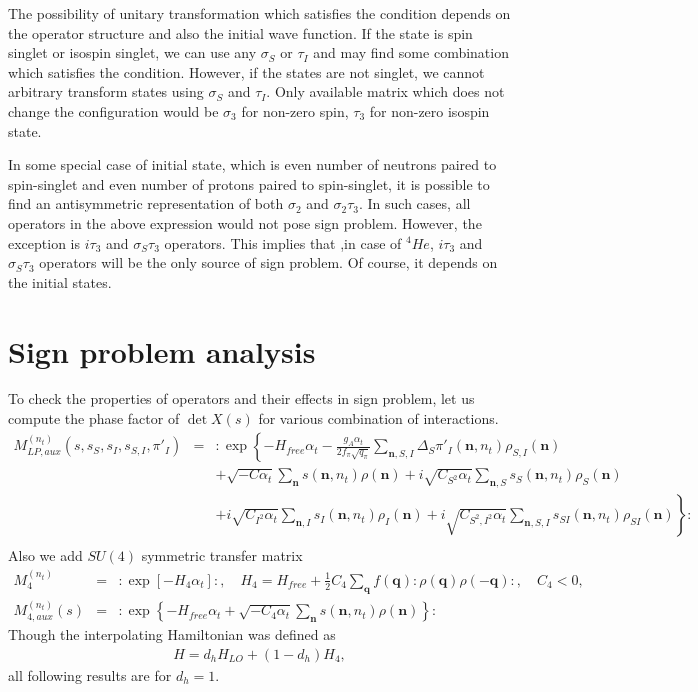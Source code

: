 \documentclass[10pt]{book}
\def\bm{\boldsymbol}
\newcommand{\bea}{\begin{eqnarray}}
\newcommand{\eea}{\end{eqnarray}}
\newcommand{\no}{\nonumber \\}
\def\vn{{\bm n}}
\def\vq{{\bm q}}
\begin{document}
The possibility of unitary transformation which satisfies
the condition depends on the operator structure and 
also the initial wave function. 
If the state is spin singlet or isospin singlet,
we can use any $\sigma_S$ or $\tau_I$ and may find
some combination which satisfies the condition.
However, if the states are not singlet, 
we cannot arbitrary transform states using 
$\sigma_S$ and $\tau_I$. Only available
matrix which does not change the configuration would be
$\sigma_3$ for non-zero spin, 
$\tau_3$ for non-zero isospin state.

In some special case of initial state,
which is even number of neutrons paired to spin-singlet and 
even number of protons paired to spin-singlet,
it is possible to find an antisymmetric representation of 
both $\sigma_2$ and $\sigma_2\tau_3$. 
In such cases, all operators in the above
expression would not pose sign problem. However, the exception is 
$i\tau_3$ and $\sigma_S\tau_3$ operators. This implies that
,in case of ${}^4He$, $i\tau_3$ and $\sigma_S\tau_3$ operators
will be the only source of sign problem. Of course, 
it depends on the initial states.

\newpage

\chapter{Sign problem analysis}

To check the properties of operators and their effects in sign problem,
let us compute the phase factor of $\det X(s)$ for various combination of 
interactions.
\bea 
M_{LP,aux}^{(n_t)}(s,s_{S},s_{I},s_{S,I},\pi'_I )
&=& :\exp\left\{ -H_{free}\alpha_t 
  -\frac{ g_{A}\alpha_t}{2f_\pi\sqrt{q_\pi}}\sum_{\vn,S,I}
   \Delta_{S}\pi'_{I}(\vn,n_t)\rho_{S,I}(\vn) \right. \no & & 
   +\sqrt{-C\alpha_t}\sum_{\vn}s(\vn,n_t)\rho(\vn)
   +i\sqrt{C_{S^2}\alpha_t}\sum_{\vn,S}s_S(\vn,n_t)\rho_S(\vn) 
   \no & &
   \left.
   +i\sqrt{C_{I^2}\alpha_t}\sum_{\vn,I}s_I(\vn,n_t)\rho_I(\vn) 
   +i\sqrt{C_{S^2,I^2}\alpha_t}\sum_{\vn,S,I}s_{SI}(\vn,n_t)\rho_{SI}(\vn) 
 \right\}: \no 
\eea  
Also we add $SU(4)$ symmetric transfer matrix
\bea 
M_4^{(n_t)}&=&:\exp[-H_4\alpha_t]:,\quad H_4=H_{free}
+\frac{1}{2}C_4\sum_{\vq}f(\vq):\rho(\vq)\rho(-\vq):,\quad C_4<0,\no 
M^{(n_t)}_{4,aux}(s)&=&:\exp\left\{ -H_{free}\alpha_t
   +\sqrt{-C_4\alpha_t}\sum_{\vn}s(\vn,n_t)\rho(\vn) \right\}:
\eea 
Though the interpolating Hamiltonian was defined as
\bea 
H=d_h H_{LO}+(1-d_h) H_4,
\eea 
all following results are for $d_h=1$. 
\end{document}
